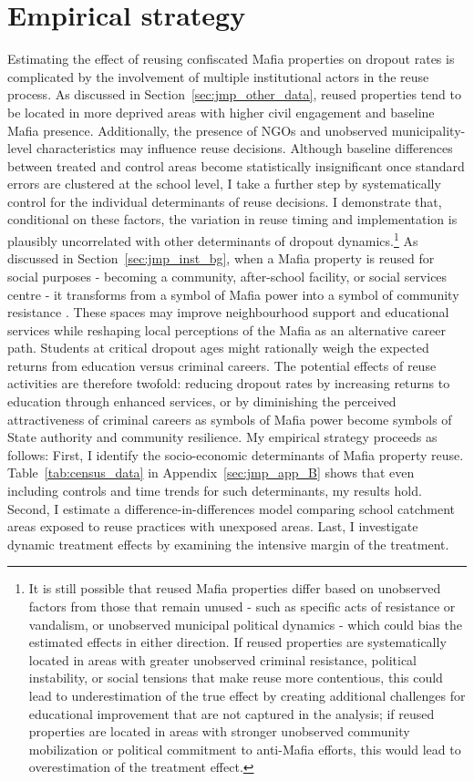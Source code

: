 \documentclass[12pt]{article}
\theoremstyle{plain}
\theoremstyle{plain}
\theoremstyle{plain}
\theoremstyle{definition}
\theoremstyle{plain}
\theoremstyle{definition}
\theoremstyle{plain}
\theoremstyle{remark}
\theoremstyle{definition}
\theoremstyle{definition}
\theoremstyle{plain}
\begin{document}
\section{Empirical strategy}
\label{sec:jmp_empirical}
Estimating the effect of reusing confiscated Mafia properties on dropout rates is complicated by the involvement of multiple institutional actors in the reuse process. As discussed in Section~\ref{sec:jmp_other_data}, reused properties tend to be located in more deprived areas with higher civil engagement and baseline Mafia presence. Additionally, the presence of NGOs and unobserved municipality-level characteristics may influence reuse decisions. Although baseline differences between treated and control areas become statistically insignificant once standard errors are clustered at the school level, I take a further step by systematically control for the individual determinants of reuse decisions. I demonstrate that, conditional on these factors, the variation in reuse timing and implementation is plausibly uncorrelated with other determinants of dropout dynamics.\footnote{It is still possible that reused Mafia properties differ based on unobserved factors from those that remain unused - such as specific acts of resistance or vandalism, or unobserved municipal political dynamics - which could bias the estimated effects in either direction. If reused properties are systematically located in areas with greater unobserved criminal resistance, political instability, or social tensions that make reuse more contentious, this could lead to underestimation of the true effect by creating additional challenges for educational improvement that are not captured in the analysis; if reused properties are located in areas with stronger unobserved community mobilization or political commitment to anti-Mafia efforts, this would lead to overestimation of the treatment effect.}
As discussed in Section~\ref{sec:jmp_inst_bg}, when a Mafia property is reused for social purposes - becoming a community, after-school facility, or social services centre - it transforms from a symbol of Mafia power into a symbol of community resistance \citep{mosca_social_2017}. These spaces may improve neighbourhood support and educational services while reshaping local perceptions of the Mafia as an alternative career path. Students at critical dropout ages might rationally weigh the expected returns from education versus criminal careers. The potential effects of reuse activities are therefore twofold: reducing dropout rates by increasing returns to education through enhanced services, or by diminishing the perceived attractiveness of criminal careers as symbols of Mafia power become symbols of State authority and community resilience.
My empirical strategy proceeds as follows: First, I identify the socio-economic determinants of Mafia property reuse. Table~\ref{tab:census_data} in Appendix~\ref{sec:jmp_app_B} shows that even including controls and time trends for such determinants, my results hold. Second, I estimate a difference-in-differences model comparing school catchment areas exposed to reuse practices with unexposed areas. Last, I investigate dynamic treatment effects by examining the intensive margin of the treatment. \par
\FloatBarrier
\end{document}
